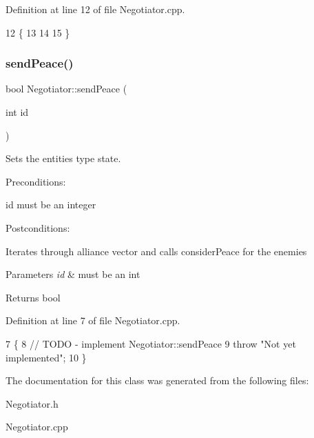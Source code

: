 Definition at line 12 of file Negotiator.\+cpp.


\begin{DoxyCode}
12                                                   \{
13     
14 
15 \}
\end{DoxyCode}
\mbox{\label{classNegotiator_a30efddcdba1469a147a7429a540033b1}} 
\subsubsection{\texorpdfstring{send\+Peace()}{sendPeace()}}
{\footnotesize\ttfamily bool Negotiator\+::send\+Peace (\begin{DoxyParamCaption}\item[{int}]{id }\end{DoxyParamCaption})}



Sets the entities type state. 

Preconditions\+:
\begin{DoxyItemize}
\item id must be an integer
\end{DoxyItemize}

Postconditions\+:
\begin{DoxyItemize}
\item Iterates through alliance vector and calls consider\+Peace for the enemies
\end{DoxyItemize}


\begin{DoxyParams}{Parameters}
{\em id} & must be an int \\
\hline
\end{DoxyParams}
\begin{DoxyReturn}{Returns}
bool 
\end{DoxyReturn}


Definition at line 7 of file Negotiator.\+cpp.


\begin{DoxyCode}
7                                  \{
8     \textcolor{comment}{// TODO - implement Negotiator::sendPeace}
9     \textcolor{keywordflow}{throw} \textcolor{stringliteral}{"Not yet implemented"};
10 \}
\end{DoxyCode}


The documentation for this class was generated from the following files\+:\begin{DoxyCompactItemize}
\item 
Negotiator.\+h\item 
Negotiator.\+cpp\end{DoxyCompactItemize}
